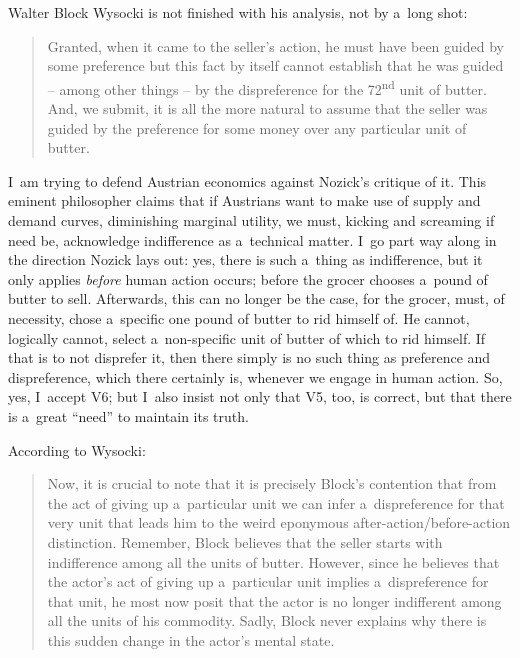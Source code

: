 \begin{artengenv}{Walter Block}
Wysocki is not finished with his analysis, not by a~long shot:



\begin{quote}
Granted, when it came to the seller's action, he must have been guided by some preference but this fact by itself cannot establish that he was guided -- among other things -- by the dispreference for the 72\textsuperscript{nd} unit of butter. And, we submit, it is all the more natural to assume that the seller was guided by the preference for some money over any particular unit of butter.
\end{quote}



I~am trying to defend Austrian economics against Nozick's 
\parencite*[][]{nozick_austrian_1977} %
 critique of it. This eminent philosopher claims that if Austrians want to make use of supply and demand curves, diminishing marginal utility, we must, kicking and screaming if need be, acknowledge indifference as a~technical matter. I~go part way along in the direction Nozick lays out: yes, there is such a~thing as indifference, but it only applies \textit{before} human action occurs; before the grocer chooses a~pound of butter to sell. Afterwards, this can no longer be the case, for the grocer, must, of necessity, chose a~specific one pound of butter to rid himself of. He cannot, logically cannot, select a~non-specific unit of butter of which to rid himself. If that is to not disprefer it, then there simply is no such thing as preference and dispreference, which there certainly is, whenever we engage in human action. So, yes, I~accept V6; but I~also insist not only that V5, too, is correct, but that there is a~great ``need'' to maintain its truth.



According to Wysocki:



\begin{quote}
Now, it is crucial to note that it is precisely Block's contention that from the act of giving up a~particular unit we can infer a~dispreference for that very unit that leads him to the weird eponymous after-action/before-action distinction. Remember, Block believes that the seller starts with indifference among all the units of butter. However, since he believes that the actor's act of giving up a~particular unit implies a~dispreference for that unit, he most now posit that the actor is no longer indifferent among all the units of his commodity. Sadly, Block never explains why there is this sudden change in the actor's mental state.
\end{quote}




\end{artengenv}
